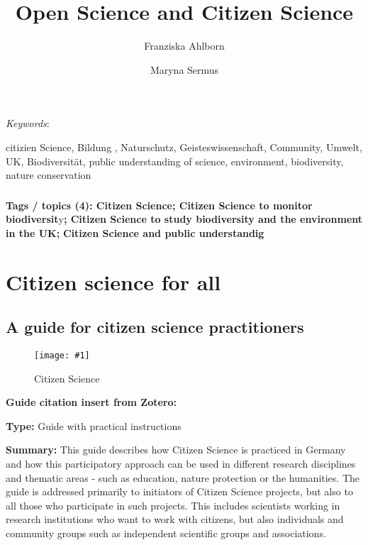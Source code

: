 \documentclass{article}
\def\keywords{\vspace{.5em}
                
{\textit{Keywords}:\,\relax%
                
}}
\newcommand{\sep}{, }
\newlength{\imgwidth}
\newcommand\scaledgraphics[2]{%
                
\settowidth{\imgwidth}{\texttt{[image: \#1]}}%
                
\setlength{\imgwidth}{\minof{\imgwidth}{#2\textwidth}}%
                
\texttt{[image: \#1]}%
                
}
\begin{document}
\title{Open Science and Citizen Science}

\maketitle

\author{Franziska Ahlborn}
\author{Maryna Sermus}
\affil{}


\keywords{citizien Science\sep Bildung \sep Naturschutz\sep Geisteswissenschaft\sep Community\sep Umwelt\sep UK\sep Biodiversität\sep public understanding of science\sep environment\sep biodiversity\sep nature conservation}

\subsubsection{}\label{H1731420}



\textbf{Tags / topics (4): Citizen Science; Citizen Science to monitor biodiversit}y\textbf{; Citizen Science to study biodiversity and the environment in the UK;} \textbf{Citizen Science and public understandig}


\section{Citizen science for all}\label{H2662301}



\subsection{A guide for citizen science practitioners}\label{H9328356}



\begin{center}
\begin{figure}
\scaledgraphics{3cbbd8ed-7495-46a8-8cb5-114cf95cfb83.png}{0.5}
\caption*{Citizen Science}\label{F38618731}
\end{figure}


\end{center}





\textbf{Guide citation insert from Zotero:} \autocite{noauthor_citizen_2016}


\textbf{Type: }Guide with practical instructions


\textbf{Summary: }This guide describes how Citizen Science is practiced in Germany and how this participatory approach can be used in different research disciplines and thematic areas - such as education, nature protection or the humanities. The guide is addressed primarily to initiators of Citizen Science projects, but also to all those who participate in such projects. This includes scientists working in research institutions who want to work with citizens, but also individuals and community groups such as independent scientific groups and associations.
\end{document}
